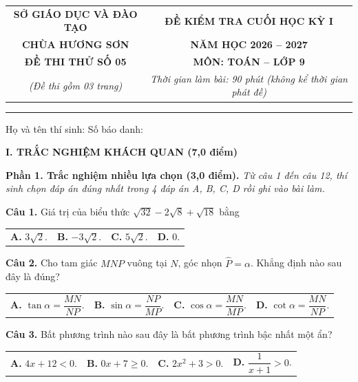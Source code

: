 \documentclass[11pt,a4paper]{article}
\begin{document}
\noindent
\begin{tabular*}{\linewidth}{@{\extracolsep{\fill}}cc@{}}
\textbf{SỞ GIÁO DỤC VÀ ĐÀO TẠO} & \textbf{ĐỀ KIỂM TRA CUỐI HỌC KỲ I} \\
\textbf{CHÙA HƯƠNG SƠN} & \textbf{NĂM HỌC 2026 -- 2027} \\
\textbf{ĐỀ THI THỬ SỐ 05} & \textbf{MÔN: TOÁN -- LỚP 9} \\
\textit{(Đề thi gồm 03 trang)} & \textit{Thời gian làm bài: 90 phút (không kể thời gian phát đề)} \\
\end{tabular*}

\vspace{2mm}
\noindent
\rule{\linewidth}{0.8pt}

\vspace{1mm}
\noindent
Họ và tên thí sinh: \dotfill Số báo danh: \dotfill

\vspace{2mm}
\noindent
\textbf{\large I. TRẮC NGHIỆM KHÁCH QUAN (7,0 điểm)}

\vspace{1mm}
\noindent
\textbf{Phần 1. Trắc nghiệm nhiều lựa chọn (3,0 điểm).} \textit{Từ câu 1 đến câu 12, thí sinh chọn đáp án đúng nhất trong 4 đáp án A, B, C, D rồi ghi vào bài làm.}

\vspace{1.5mm}
\textbf{Câu 1.} Giá trị của biểu thức $\sqrt{32} - 2\sqrt{8} + \sqrt{18}$ bằng\\
\begin{tabularx}{\linewidth}{XXXX}
\textbf{A.} $3\sqrt{2}$. & \textbf{B.} $-3\sqrt{2}$. & \textbf{C.} $5\sqrt{2}$. & \textbf{D.} $0$.
\end{tabularx}

\vspace{1.5mm}
\textbf{Câu 2.} Cho tam giác $MNP$ vuông tại $N$, góc nhọn $\widehat{P} = \alpha$. Khẳng định nào sau đây là đúng?\\
\begin{tabularx}{\linewidth}{XXXX}
\textbf{A.} $\tan \alpha = \dfrac{MN}{NP}$. & \textbf{B.} $\sin \alpha = \dfrac{NP}{MP}$. & \textbf{C.} $\cos \alpha = \dfrac{MN}{MP}$. & \textbf{D.} $\cot \alpha = \dfrac{MN}{NP}$.
\end{tabularx}

\vspace{1.5mm}
\textbf{Câu 3.} Bất phương trình nào sau đây là bất phương trình bậc nhất một ẩn?\\
\begin{tabularx}{\linewidth}{XXXX}
\textbf{A.} $4x + 12 < 0$. & \textbf{B.} $0x + 7 \ge 0$. & \textbf{C.} $2x^2 + 3 > 0$. & \textbf{D.} $\dfrac{1}{x+1} > 0$.
\end{tabularx}
\end{document}
